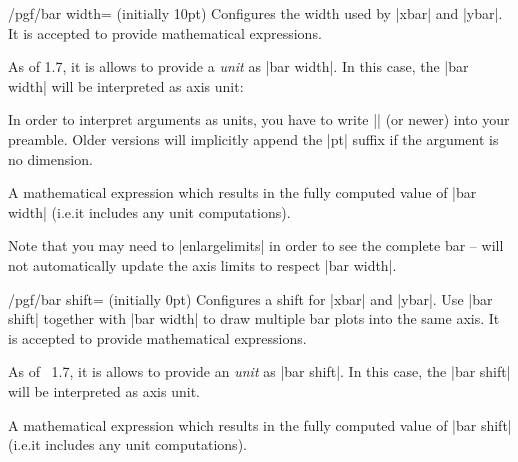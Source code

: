 {\begin{key}{/pgf/bar width= (initially 10pt)}
    Configures the width used by |xbar| and |ybar|. It is accepted to provide
    mathematical expressions.

    As of \PGFPlots{} 1.7, it is allows to provide a \emph{unit} as
    |bar width|. In this case, the |bar width| will be interpreted as axis unit:
\begin{codeexample}[]
\end{codeexample}
    In order to interpret arguments as units, you have to write
    |\pgfplotsset{compat=1.7}| (or newer) into your preamble. Older versions
    will implicitly append the |pt| suffix if the argument is no dimension.

    \begin{command}{\pgfplotbarwidth}
        A mathematical expression which results in the fully computed value of
        |bar width| (i.e.\@ it includes any unit computations).
    \end{command}

    Note that you may need to |enlargelimits| in order to see the complete bar
    -- \PGFPlots{} will not automatically update the axis limits to respect
    |bar width|.
\end{key}

\begin{key}{/pgf/bar shift= (initially 0pt)}
    Configures a shift for |xbar| and |ybar|. Use |bar shift| together with
    |bar width| to draw multiple bar plots into the same axis. It is accepted
    to provide mathematical expressions.

    As of \PGFPlots{}~1.7, it is allows to provide an \emph{unit} as
    |bar shift|. In this case, the |bar shift| will be interpreted as axis unit.

    \begin{command}{\pgfplotbarshift}
        A mathematical expression which results in the fully computed value of
        |bar shift| (i.e.\@ it includes any unit computations).
    \end{command}


\end{key}}
